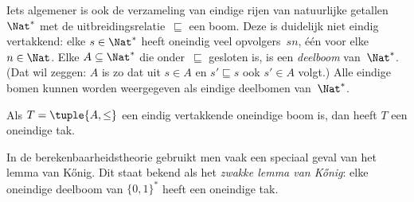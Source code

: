 \documentclass[../../../include/open-logic-section]{subfiles}
\begin{document}
\begin{ex}
Iets algemener is ook de verzameling van eindige rijen van natuurlijke
getallen~$\Nat^*$ met de uitbreidingsrelatie~$\sqsubseteq$ een boom.
Deze is duidelijk niet eindig vertakkend: elke $s \in \Nat^*$ heeft
oneindig veel opvolgers~$sn$, één voor elke $n \in \Nat$. Elke
$A \subseteq \Nat^*$ die onder~$\sqsubseteq$ gesloten is, is een
\emph{deelboom} van~$\Nat^*$. (Dat wil zeggen: $A$ is zo dat uit
$s \in A$ en $s' \sqsubseteq s$ ook $s' \in A$ volgt.) Alle eindige
bomen kunnen worden weergegeven als eindige deelbomen van~$\Nat^*$.
\end{ex}

\begin{prop}
Als $T = \tuple{A,\le}$ een eindig vertakkende oneindige boom is, dan
heeft $T$ een oneindige tak.
\end{prop}

In de berekenbaarheidstheorie gebruikt men vaak een speciaal geval van
het lemma van K\H{o}nig. Dit staat bekend als het \emph{zwakke lemma van
K\H{o}nig}: elke oneindige deelboom van $\{0,1\}^*$ heeft een
oneindige tak.
\end{document}
